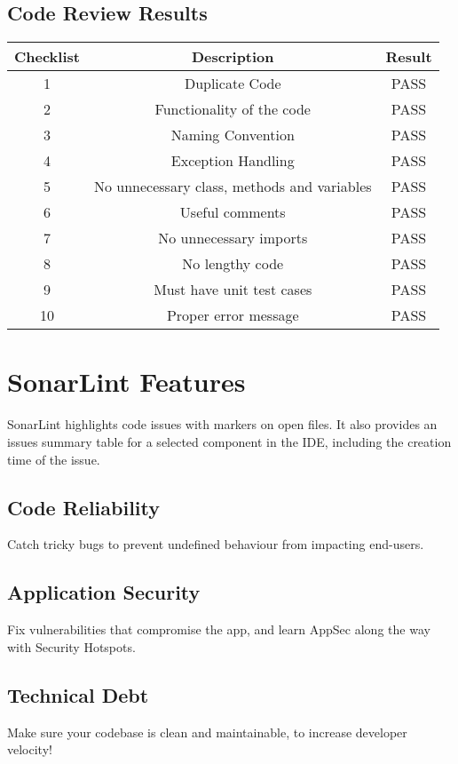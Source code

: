 \documentclass{article}
\begin{document}
 \subsection{Code Review Results}
    \begin{center}
    \begin{tabular}{||c c c||} 
     \hline
     Checklist & Description & Result \\ 
     \hline\hline
     1 & Duplicate Code & PASS \\ 
     \hline
     2 & Functionality of the code & PASS \\
     \hline
     3 & Naming Convention & PASS \\
     \hline
     4 & Exception Handling & PASS \\
     \hline
     5 & No unnecessary class, methods and variables & PASS \\ 
     \hline
     6 & Useful comments & PASS \\
     \hline
     7 & No unnecessary imports & PASS \\
     \hline
     8 & No lengthy code & PASS \\
     \hline
     9 & Must have unit test cases & PASS \\
     \hline
     10 & Proper error message & PASS \\
     \hline
    \end{tabular}
    \end{center}
\section{SonarLint Features}
SonarLint highlights code issues with markers on open files. It also provides an issues summary table for a selected component in the IDE, including the creation time of the issue.
\subsection{Code Reliability}
Catch tricky bugs to prevent undefined behaviour from impacting end-users.
\subsection {Application Security}
Fix vulnerabilities that compromise the app, and learn AppSec along the way with Security Hotspots.
\subsection{Technical Debt}
Make sure your codebase is clean and maintainable, to increase developer velocity!
\newpage
\end{document}

